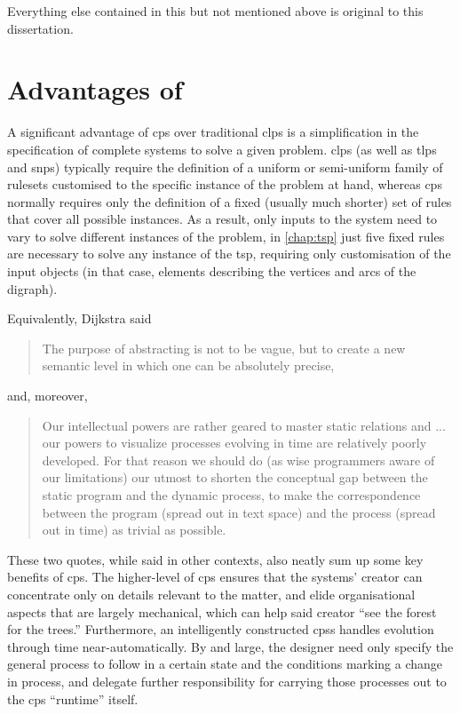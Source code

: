 Everything else contained in this  but not mentioned above is original to this dissertation.


\section{Advantages of }
A significant advantage of \gls{cps} over traditional \gls{clps} is a simplification in the specification of complete systems to solve a given problem.  \Gls{clps} (as well as \gls{tlps} and \gls{snps}) typically require the definition of a uniform or semi-uniform family of \glspl{ruleset} customised to the specific instance of the problem at hand, whereas \gls{cps} normally requires only the definition of a fixed (usually much shorter) set of rules that cover all possible instances. As a result, only inputs to the system need to vary to solve different instances of the problem, \eg{} in \cref{chap:tsp} just five fixed rules are necessary to solve any instance of the \gls{tsp}, requiring only customisation of the input objects (in that case, elements describing the vertices and arcs of the digraph).

Equivalently, Dijkstra \cite{DijkstraWikiquote} said \blockquote{The purpose of abstracting is not to be vague, but to create a new semantic level in which one can be absolutely precise,} and, moreover, \blockquote{Our intellectual powers are rather geared to master static relations and ... our powers to visualize processes evolving in time are relatively poorly developed. For that reason we should do (as wise programmers aware of our limitations) our utmost to shorten the conceptual gap between the static program and the dynamic process, to make the correspondence between the program (spread out in text space) and the process (spread out in time) as trivial as possible.}.  These two quotes, while said in other contexts, also neatly sum up some key benefits of \gls{cps}.  The higher-level of \gls{cps} ensures that the systems' creator can concentrate only on details relevant to the matter, and elide organisational aspects that are largely mechanical, which can help said creator \enquote{see the forest for the trees.}  Furthermore, an intelligently constructed \glspl{cps} handles evolution through time near-automatically.  By and large, the designer need only specify the general process to follow in a certain state and the conditions marking a change in process, and delegate further responsibility for carrying those processes out to the \gls{cps} ``runtime'' itself.

